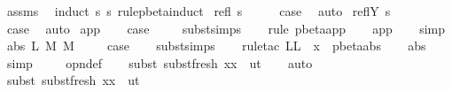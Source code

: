 \begin{isabellebody}
\ assms\ \isamarkupfalse%
\ {\isacharparenleft}induct\ s\ s{\isacharprime}\ rule{\isacharcolon}pbeta{\isachardot}induct{\isacharparenright}\isanewline
{}\isamarkupfalse%
\ {\isacharparenleft}refl\ s{\isacharparenright}\isanewline
\ \ \isamarkupfalse%
\ \isamarkupfalse%
\ {\isacharquery}case\ \isamarkupfalse%
\ auto\isanewline
{}\isamarkupfalse%
\isanewline
{}\isamarkupfalse%
\ {\isacharparenleft}reflY\ s{\isacharparenright}\isanewline
\ \ \isamarkupfalse%
\ \isamarkupfalse%
\ {\isacharquery}case\ \isamarkupfalse%
\ auto\isanewline
{}\isamarkupfalse%
\isanewline
{}\isamarkupfalse%
\ app\isanewline
\ \ \isamarkupfalse%
\ {\isacharquery}case\ \isanewline
\ \ \isamarkupfalse%
\ subst{\isachardot}simps\isanewline
\ \ \isamarkupfalse%
\ {\isacharparenleft}rule\ pbeta{\isachardot}app{\isacharparenright}\isanewline
\ \ \isamarkupfalse%
\ app\isanewline
\ \ \isamarkupfalse%
\ simp{\isacharplus}\isanewline
{}\isamarkupfalse%
\isanewline
{}\isamarkupfalse%
\ {\isacharparenleft}abs\ L\ M\ M{\isacharprime}{\isacharparenright}\ \isanewline
\ \ \isamarkupfalse%
\ {\isacharquery}case\isanewline
\ \ \isamarkupfalse%
\ subst{\isachardot}simps\isanewline
\ \ \isamarkupfalse%
\ {\isacharparenleft}rule{\isacharunderscore}tac\ L{\isacharequal}{\isachardoublequoteopen}L\ {\isasymunion}\ {\isacharbraceleft}x{\isacharbraceright}{\isachardoublequoteclose}\ \ pbeta{\isachardot}abs{\isacharparenright}\isanewline
\ \ \isamarkupfalse%
\ abs\ \isamarkupfalse%
\ simp\ \isanewline
\ \ \isamarkupfalse%
\ opn{\isacharprime}{\isacharunderscore}def\isanewline
\ \ \isamarkupfalse%
\ {\isacharparenleft}subst\ subst{\isacharunderscore}fresh{}{\isacharbrackleft}\ x{\isacharequal}x\ \ u{\isacharequal}t{\isacharbrackright}{\isacharparenright}\isanewline
\ \ \isamarkupfalse%
\ auto{\isacharbrackleft}{}{\isacharbrackright}\isanewline
\ \ \isamarkupfalse%
\ {\isacharparenleft}subst{\isacharparenleft}{}{\isacharparenright}\ subst{\isacharunderscore}fresh{}{\isacharbrackleft}\ x{\isacharequal}x\ \ u{\isacharequal}t{\isacharprime}{\isacharbrackright}{\isacharparenright}\isanewline

\end{isabellebody}
